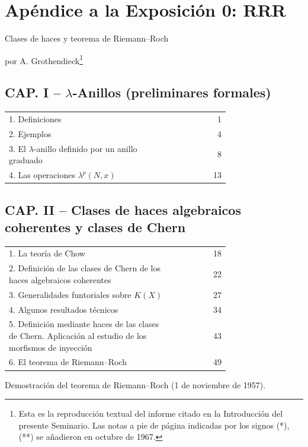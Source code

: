 \providecommand{\sisi}[2]{#2}

\section*{Apéndice a la Exposición 0: RRR}
\begin{center}
{\Large Clases de haces y teorema de Riemann--Roch}\par
\vspace{0.5em}
por A. Grothendieck\footnote{Esta es la reproducción textual del informe citado en la Introducción del presente Seminario. Las notas a pie de página indicadas por los signos (*), (**) se añadieron en octubre de 1967.}
\end{center}

\subsection*{CAP. I -- $\lambda$-Anillos (preliminares formales)}
\begin{longtable}{@{}p{0.74\linewidth}r@{}}
1. Definiciones & 1\\
2. Ejemplos & 4\\
3. El $\lambda$-anillo definido por un anillo graduado & 8\\
4. Las operaciones $\lambda^p(N,x)$ & 13\\
\end{longtable}

\subsection*{CAP. II -- Clases de haces algebraicos coherentes y clases de Chern}
\begin{longtable}{@{}p{0.74\linewidth}r@{}}
1. La teoría de Chow & 18\\
2. Definición de las clases de Chern de los haces algebraicos coherentes & 22\\
3. Generalidades funtoriales sobre $K(X)$ & 27\\
4. Algunos resultados técnicos & 34\\
5. Definición mediante haces de las clases de Chern. Aplicación al estudio de los morfismos de inyección & 43\\
6. El teorema de Riemann--Roch & 49
\end{longtable}

\begin{center}
Demostración del teorema de Riemann--Roch (1 de noviembre de 1957).
\end{center}

